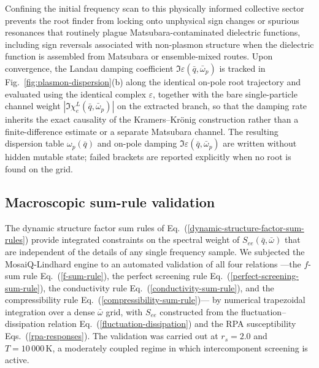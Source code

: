 \documentclass[aps,showkeys,noshowpacs,superscriptaddress,pre,preprint]{revtex4-2}
\let\label\orilabel
\begin{document}
Confining the initial frequency scan to this physically informed collective sector prevents the root finder from locking onto unphysical sign changes or spurious resonances that routinely plague Matsubara-contaminated dielectric functions,
including sign reversals associated with non-plasmon structure when the dielectric function is assembled from Matsubara or ensemble-mixed routes.
Upon convergence, the Landau damping coefficient
$\Im \varepsilon \left( \bar{q}, \bar{\omega}_p \right)$
is tracked in Fig.~\ref{fig:plasmon-dispersion}(b) along the identical on-pole root trajectory and evaluated using the identical complex $\varepsilon$,
together with the bare single-particle channel weight $|\Im \chi_e^L(\bar{q}, \bar{\omega}_p)|$ on the extracted branch,
so that the damping rate inherits the exact causality of the Kramers--Kr\"onig construction
rather than a finite-difference estimate or a separate Matsubara channel.
The resulting dispersion table $\omega_p(\bar{q})$ and on-pole damping
$\Im \varepsilon(\bar{q}, \bar{\omega}_p)$ are written without hidden mutable state;
failed brackets are reported explicitly when no root is found on the grid.

\subsection{Macroscopic sum-rule validation}
\label{sec:sum-rule-validation}

The dynamic structure factor sum rules of Eq.~(\ref{dynamic-structure-factor-sum-rules})
provide integrated constraints on the spectral weight of $S_{ee}(\bar{q}, \bar{\omega})$
that are independent of the details of any single frequency sample.
We subjected the MosaiQ-Lindhard engine to an automated validation of all four relations
---the $f$-sum rule Eq.~(\ref{f-sum-rule}),
the perfect screening rule Eq.~(\ref{perfect-screening-sum-rule}),
the conductivity rule Eq.~(\ref{conductivity-sum-rule}),
and the compressibility rule Eq.~(\ref{compressibility-sum-rule})---
by numerical trapezoidal integration over a dense $\bar{\omega}$ grid,
with $S_{ee}$ constructed from the fluctuation--dissipation relation Eq.~(\ref{fluctuation-dissipation})
and the RPA susceptibility Eqs.~(\ref{rpa-responses}).
The validation was carried out at $r_s = 2.0$ and $T = 10\,000\,\mathrm{K}$,
a moderately coupled regime in which intercomponent screening is active.
\end{document}
